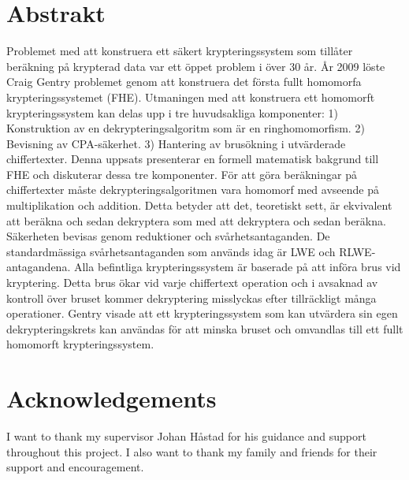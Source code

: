 \thispagestyle{plain}
\chapter*{Abstrakt}
Problemet med att konstruera ett säkert krypteringssystem som tillåter beräkning på krypterad data var ett öppet problem i över 30 år. År 2009 löste Craig Gentry problemet genom att konstruera det första fullt homomorfa krypteringssystemet (FHE). Utmaningen med att konstruera ett homomorft krypteringssystem kan delas upp i tre huvudsakliga komponenter: 1) Konstruktion av en dekrypteringsalgoritm som är en ringhomomorfism. 2) Bevisning av CPA-säkerhet. 3) Hantering av brusökning i utvärderade chiffertexter. Denna uppsats presenterar en formell matematisk bakgrund till FHE och diskuterar dessa tre komponenter. För att göra beräkningar på chiffertexter måste dekrypteringsalgoritmen vara homomorf med avseende på multiplikation och addition. Detta betyder att det, teoretiskt sett, är ekvivalent att beräkna och sedan dekryptera som med att dekryptera och sedan beräkna. Säkerheten bevisas genom reduktioner och svårhetsantaganden. De standardmässiga svårhetsantaganden som används idag är LWE och RLWE-antagandena. Alla befintliga krypteringssystem är baserade på att införa brus vid kryptering. Detta brus ökar vid varje chiffertext operation och i avsaknad av kontroll över bruset kommer dekryptering misslyckas efter tillräckligt många operationer. Gentry visade att ett krypteringssystem som kan utvärdera sin egen dekrypteringskrets kan användas för att minska bruset och omvandlas till ett fullt homomorft krypteringssystem.

\thispagestyle{plain}
\chapter*{Acknowledgements}
I want to thank my supervisor Johan Håstad for his guidance and support throughout this project. I also want to thank my family and friends for their support and encouragement.


\newpage

\thispagestyle{plain}
\tableofcontents

\newpage


